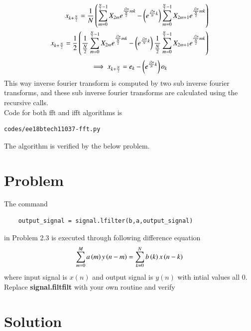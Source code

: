\documentclass[journal,12pt,twocolumn]{IEEEtran}
\begin{document}
\begin{align}
x_{k+\frac{N}{2}} = \frac{1}{N} \left(\sum _{m=0}^{\frac{N}{2}-1}X_{2m}e^{\frac{j2\pi}{\frac{N}{2}}mk} - \left( e^{\frac{j2\pi}{N}k}\right)\sum _{m=0}^{\frac{N}{2}-1}X_{2m+1}e^{\frac{j2\pi}{\frac{N}{2}}mk}\right)
\\
x_{k+\frac{N}{2}} = \frac{1}{2} \left(\frac{1}{\frac{N}{2}}\sum _{m=0}^{\frac{N}{2}-1}X_{2m}e^{\frac{j2\pi}{\frac{N}{2}}mk} - \left( e^{\frac{j2\pi}{N}k}\right) \frac{1}{\frac{N}{2}} \sum _{m=0}^{\frac{N}{2}-1}X_{2m+1}e^{\frac{j2\pi}{\frac{N}{2}}mk}\right)
\end{align}
\begin{align}
\implies x_{k+\frac{N}{2}} = e_{k} - \left( e^{\frac{j2\pi}{N}k}\right)o_{k}
\end{align}
This way inverse fourier transform is computed by two sub inverse fourier transforms, and these sub inverse fourier transforms are calculated using the recursive calls.
\\
Code for both fft and ifft algorithms is
\begin{lstlisting}
codes/ee18btech11037-fft.py
\end{lstlisting}
The algorithm is verified by the below problem.
\section{Problem}
The command
\begin{lstlisting}
    output_signal = signal.lfilter(b,a,output_signal)
\end{lstlisting}
in Problem 2.3 is executed through following difference equation 
    \begin{align}
        \sum _{m=0}^{M}a\left(m\right)y\left(n-m\right)=\sum _{k=0}^{N}b\left(k\right)x\left(n-k\right)
    \end{align}
 where input signal is $x(n)$ and output signal is $y(n)$ with intial values all 0. Replace \textbf{signal.filtfilt} with your own routine and verify
  \section{Solution}
  
\end{document}
